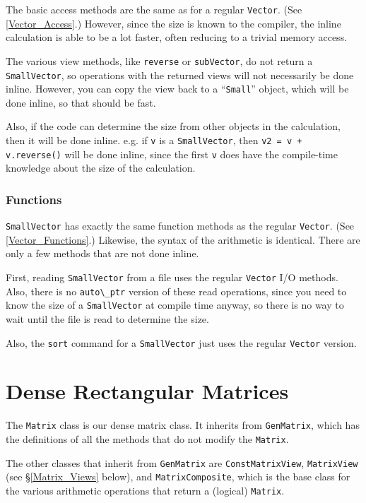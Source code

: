 \documentclass[twoside,letterpaper,11pt]{article}
\renewcommand{\tt}[1]{{\lstinline {#1}}}
\begin{document}
The basic access methods are the same as for a regular \tt{Vector}.
(See \ref{Vector_Access}.)
However, since the size is known to the compiler, the inline calculation is able
to be a lot faster, often reducing to a trivial memory access.

The various view methods, like \tt{reverse} or \tt{subVector},
do not return a \tt{SmallVector}, so operations 
with the returned views will not necessarily be done inline.
However, you can copy the view back to a ``\tt{Small}'' object, which will be done 
inline, so that should be fast.

Also, if the code can determine the size from other objects in the calculation, then
it will be done inline.  e.g. if \tt{v} is a \tt{SmallVector}, then 
\tt{v2 = v + v.reverse()} will be done inline, since the first \tt{v} does have 
the compile-time knowledge about the size of the calculation.

\subsubsection{Functions}
\label{SmallVector_Functions}

\tt{SmallVector} has exactly the same
function methods as the regular \tt{Vector}.  
(See \ref{Vector_Functions}.)
Likewise, the syntax of the
arithmetic is identical.  There are only a few methods that 
are not done inline.  

First, reading \tt{SmallVector} from a file 
uses the regular
\tt{Vector} I/O methods.  Also, there is no \tt{auto\_ptr} 
version of these read operations, since you need to know the 
size of a \tt{SmallVector} at compile time anyway, 
so there is no way to wait until the file is read to determine the size.

Also, the \tt{sort} command for a \tt{SmallVector} just uses the
regular \tt{Vector} version.

\newpage
\section{Dense Rectangular Matrices}
\label{Matrix}

The \tt{Matrix} class is our dense matrix class.  It inherits from \tt{GenMatrix},
which has the definitions of all the methods that 
do not modify the \tt{Matrix}.

The other classes that inherit from \tt{GenMatrix} are \tt{ConstMatrixView},
\tt{MatrixView} (see \S\ref{Matrix_Views} below), and \tt{MatrixComposite}, which 
is the base class for the various arithmetic operations that return a 
(logical) \tt{Matrix}.  
\end{document}
